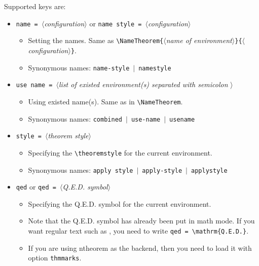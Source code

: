\documentclass[classical]{einfart}
\newcommand{\meta}[1]{$\langle${\normalfont\itshape#1}$\rangle$}
\newcommand{\packageoption}[1]{\texttt{\textcolor{code-option}{#1}}}
\newcommand{\commandoption}[1]{\texttt{\textcolor{code-keys}{#1}}}
\begin{document}
\enlargethispage{2\baselineskip}
Supported keys are:
\vspace{-.2\baselineskip}
\begin{itemize}[label=,leftmargin=1.25em,itemindent=-1.25em]
    \item \commandoption{name}\lstinline| = |\meta{configuration} \quad or \quad \commandoption{name style}\lstinline| = |\meta{configuration}
        \begin{itemize}
            \item Setting the names. Same as \lstinline|\NameTheorem{|\meta{name of environment}\lstinline|}{|\meta{configuration}\lstinline|}|.
            \item Synonymous names: \commandoption{name-style} \,$|$\, \commandoption{namestyle}
        \end{itemize}
    \item \commandoption{use name}\lstinline| = |\meta{list of existed environment(s) separated with semicolon \textquote{ ; }}
        \begin{itemize}
            \item Using existed name(s). Same as in \lstinline|\NameTheorem|.
            \item Synonymous names: \commandoption{combined} \,$|$\, \commandoption{use-name} \,$|$\, \commandoption{usename}
        \end{itemize}
    \item \commandoption{style}\lstinline| = |\meta{theorem style}
        \begin{itemize}
            \item Specifying the \lstinline|\theoremstyle| for the current environment.
            \item Synonymous names: \commandoption{apply style} \,$|$\, \commandoption{apply-style} \,$|$\, \commandoption{applystyle}
        \end{itemize}
    \item \commandoption{qed} or \commandoption{qed}\lstinline| = |\meta{Q.E.D. symbol}
        \begin{itemize}
            \item Specifying the Q.E.D. symbol for the current environment.
            \item Note that the Q.E.D. symbol has already been put in math mode. If you want regular text such as , you need to write \commandoption{qed}\lstinline| = \mathrm{Q.E.D.}|.
            \item If you are using \textsf{ntheorem} as the backend, then you need to load it with option \packageoption{thmmarks}.

\end{itemize}
\end{itemize}
\end{document}
